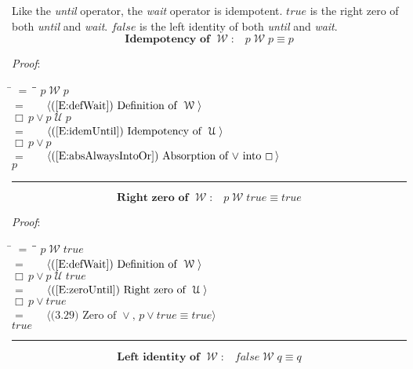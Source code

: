 \documentclass[12pt, fleqn, leqno]{article}
\newcommand{\lgap}{2pt}                             %
\newcommand{\mymathindent}{24pt}                    %
\newcommand{\Until}{\;\mathcal{U}\;}
\newcommand{\Wait}{\;\mathcal{W}\;}
\newcommand{\Always}{\Box\,}
\newcommand{\myqed}{\rule[-.23ex]{1.2ex}{2.0ex}}
\newcommand{\myqedtab}{\hspace{384pt}}              %
\newcommand{\Gll} {\langle}                         %
\newcommand{\Ggg} {\rangle}                         %
\newcommand{\Hint}[1]     {\ \ \ $\Gll              \mbox{#1} \Ggg$ }   %
\begin{document}
Like the \textit{until} operator, the \textit{wait} operator is idempotent.
$true$ is the right zero of both \textit{until} and \textit{wait}.
$false$ is the left identity of both \textit{until} and \textit{wait}.
\begin{equation}\label{E:idempWait}
\textbf{Idempotency of $\Wait$:}\quad p \Wait p \equiv p
\end{equation}

\emph{Proof}:
\begin{tabbing}
\hspace{\mymathindent} \= $= \;$ \= \myqedtab \= \kill
\> \> $p \Wait p$\\[\lgap]
\> $=$ \> \Hint{(\ref{E:defWait}) Definition of $\Wait$} \\[\lgap]
\> \> $\Always p \lor p\Until p$\\[\lgap]
\> $=$ \> \Hint{(\ref{E:idemUntil}) Idempotency of $\Until$} \\[\lgap]
\> \> $\Always p \lor p$\\[\lgap]
\> $=$ \> \Hint{(\ref{E:absAlwaysIntoOr}) Absorption of $\lor$ into $\Always$}\\[\lgap]
\> \> $p$ \quad \myqed
\end{tabbing}
\begin{equation}\label{E:rightZeroWait}
\textbf{Right zero of $\Wait$:}\quad p \Wait true \equiv true
\end{equation}

\emph{Proof}:
\begin{tabbing}
\hspace{\mymathindent} \= $= \;$ \= \myqedtab \= \kill
\> \> $p \Wait true$\\[\lgap]
\> $=$ \> \Hint{(\ref{E:defWait}) Definition of $\Wait$} \\[\lgap]
\> \> $\Always p \lor p\Until true$\\[\lgap]
\> $=$ \> \Hint{(\ref{E:zeroUntil}) Right zero of $\Until$} \\[\lgap]
\> \> $\Always p \lor true$\\[\lgap]
\> $=$ \> \Hint{(3.29) Zero of $\lor$, $p\lor true\equiv true$}\\[\lgap]
\> \> $true$ \quad \myqed
\end{tabbing}
\begin{equation}\label{E:leftIdentWait}
\textbf{Left identity of $\Wait$:}\quad false \Wait q \equiv q
\end{equation}
\end{document}
